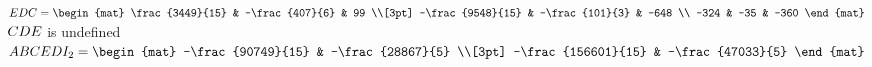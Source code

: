 \begin{Answer}
\Question $EDC = \begin{mat} \frac{3449}{15} & -\frac{407}{6} & 99 \\[3pt] -\frac{9548}{15} & -\frac{101}{3} & -648 \\ -324 & -35 & -360 \end{mat}$
\Question $CDE \vphantom{\begin{mat} -\frac{90749}{15} & -\frac{28867}{5} \\[3pt] -\frac{156601}{15} & -\frac{47033}{5} \end{mat}}$ is undefined
\Question $ABCEDI_{2} = \begin{mat} -\frac{90749}{15} & -\frac{28867}{5} \\[3pt] -\frac{156601}{15} & -\frac{47033}{5} \end{mat}$

\end{Answer}
